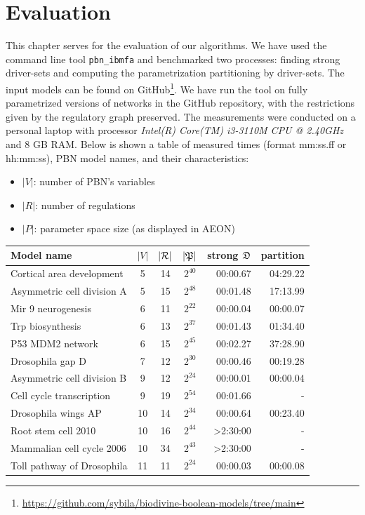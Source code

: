 \documentclass[
	digital, oneside, nosansbold, nocolorbold, nolot, nolof
]{fithesis4}
\theoremstyle{definition}
\theoremstyle{definition}
\begin{document}
\chapter{Evaluation} \label{section:results}

This chapter serves for the evaluation of our algorithms. We have used the
command line tool \texttt{pbn\_ibmfa} and benchmarked two processes: finding
strong driver-sets and computing the parametrization partitioning by
driver-sets. The input models can be found on
GitHub\footnote{\url{https://github.com/sybila/biodivine-boolean-models/tree/main}}.
We have run the tool on fully parametrized versions of networks in the GitHub
repository, with the restrictions given by the regulatory graph preserved. The
measurements were conducted on a personal laptop with processor \emph{Intel(R)
Core(TM) i3-3110M CPU @ 2.40GHz} and 8 GB RAM. Below is shown a table of
measured times (format mm:ss.ff or hh:mm:ss), PBN model names, and their
characteristics:
\begin{itemize}
    \item $|V|$: number of PBN's variables
    \item $|R|$: number of regulations
    \item $|P|$: parameter space size (as displayed in AEON)
\end{itemize}

\begin{tabular}[!ht]{@{}lcccrr@{}}
    \toprule
    Model name & $|V|$ & $|\mathcal{R}|$ & $|\mathfrak{P}|$ & strong
        $\mathfrak{D}$ & partition \\
    \midrule
    Cortical area development & 5 & 14 & $2^{40}$ & 00:00.67 & 04:29.22 \\
    Asymmetric cell division A & 5 & 15 & $2^{48}$ & 00:01.48 & 17:13.99 \\
    Mir 9 neurogenesis & 6 & 11 & $2^{22}$ & 00:00.04 & 00:00.07 \\
    Trp biosynthesis & 6 & 13 & $2^{37}$ & 00:01.43 & 01:34.40 \\
    P53 MDM2 network & 6 & 15 & $2^{45}$ & 00:02.27 & 37:28.90 \\
    Drosophila gap D & 7 & 12 & $2^{30}$ & 00:00.46 & 00:19.28 \\
    Asymmetric cell division B & 9 & 12 & $2^{24}$ & 00:00.01 & 00:00.04 \\
    Cell cycle transcription & 9 & 19 & $2^{54}$ & 00:01.66 & - \\
    Drosophila wings AP & 10 & 14 & $2^{34}$ & 00:00.64 & 00:23.40 \\
    Root stem cell 2010 & 10 & 16 & $2^{44}$ & >2:30:00 & - \\
    Mammalian cell cycle 2006 & 10 & 34 & $2^{43}$ & >2:30:00 & - \\
    Toll pathway of Drosophila & 11 & 11 & $2^{24}$ & 00:00.03 & 00:00.08 \\
    \bottomrule
\end{tabular}
\end{document}
